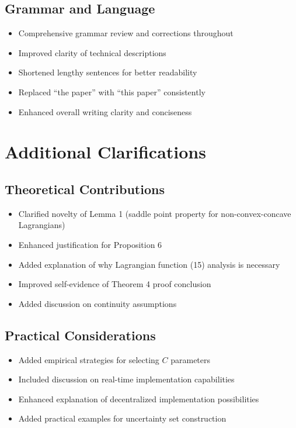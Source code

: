 \documentclass[11pt]{article}
\begin{document}
\subsection{Grammar and Language}
\begin{itemize}
\item Comprehensive grammar review and corrections throughout
\item Improved clarity of technical descriptions
\item Shortened lengthy sentences for better readability
\item Replaced ``the paper'' with ``this paper'' consistently
\item Enhanced overall writing clarity and conciseness
\end{itemize}

\section{Additional Clarifications}

\subsection{Theoretical Contributions}
\begin{itemize}
\item Clarified novelty of Lemma 1 (saddle point property for non-convex-concave Lagrangians)
\item Enhanced justification for Proposition 6
\item Added explanation of why Lagrangian function (15) analysis is necessary
\item Improved self-evidence of Theorem 4 proof conclusion
\item Added discussion on continuity assumptions
\end{itemize}

\subsection{Practical Considerations}
\begin{itemize}
\item Added empirical strategies for selecting $C$ parameters
\item Included discussion on real-time implementation capabilities
\item Enhanced explanation of decentralized implementation possibilities
\item Added practical examples for uncertainty set construction
\end{itemize}
\end{document}

